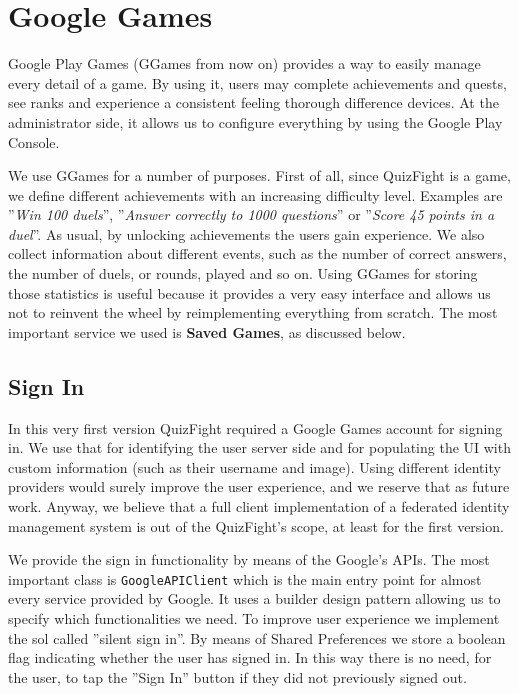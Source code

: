 \section{Google Games}
Google Play Games (GGames from now on) provides a way to easily manage every detail of a game. By using it, users may complete achievements and quests, see ranks and experience a consistent feeling thorough difference devices. At the administrator side, it allows us to configure everything by using the Google Play Console.

We use GGames for a number of purposes. First of all, since QuizFight is a game, we define different achievements with an increasing difficulty level. Examples are ''\textit{Win 100 duels}'', ''\textit{Answer correctly to 1000 questions}'' or ''\textit{Score 45 points in a duel}''. As usual, by unlocking achievements the users gain experience. We also collect information about different events, such as the number of correct answers, the number of duels, or rounds, played and so on. Using GGames for storing those statistics is useful because it provides a very easy interface and allows us not to reinvent the wheel by reimplementing everything from scratch. The most important service we used is \textbf{Saved Games}, as discussed below.

\subsection{Sign In}
In this very first version QuizFight required a Google Games account for signing in. We use that for identifying the user server side and for populating the UI with custom information (such as their username and image). Using different identity providers would surely improve the user experience, and we reserve that as future work. Anyway, we believe that a full client implementation of a federated identity management system is out of the QuizFight's scope, at least for the first version.

We provide the sign in functionality by means of the Google's APIs. The most important class is \texttt{GoogleAPIClient} which is the main entry point for almost every service provided by Google. It uses a builder design pattern allowing us to specify which functionalities we need. To improve user experience we implement the sol called ''silent sign in''. By means of Shared Preferences we store a boolean flag indicating whether the user has signed in. In this way there is no need, for the user, to tap the ''Sign In'' button if they did not previously signed out. 

